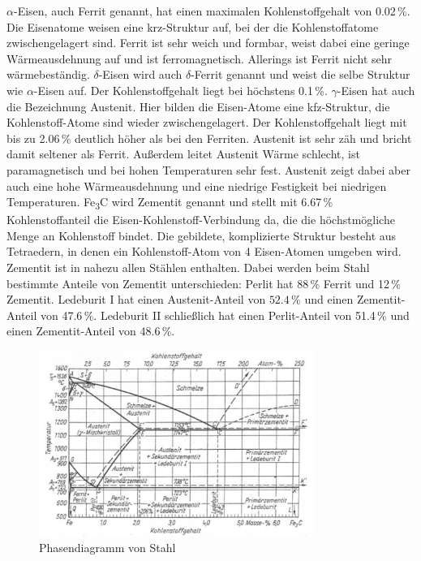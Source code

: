\documentclass[german, %
parskip=full, %
bibliography=totoc, %
]{scrartcl}
\begin{document}
$\alpha$-Eisen, auch Ferrit genannt, hat einen maximalen Kohlenstoffgehalt von 0.02\,\%. Die Eisenatome weisen eine krz-Struktur auf, bei der die Kohlenstoffatome zwischengelagert sind. Ferrit ist sehr weich und formbar, weist dabei eine geringe Wärmeausdehnung auf und ist ferromagnetisch. Allerings ist Ferrit nicht sehr wärmebeständig. \cite{ferrit}
$\delta$-Eisen wird auch $\delta$-Ferrit genannt und weist die selbe Struktur wie $\alpha$-Eisen auf. Der Kohlenstoffgehalt liegt bei höchstens 0.1\,\%. 
$\gamma$-Eisen hat auch die Bezeichnung Austenit. Hier bilden die Eisen-Atome eine kfz-Struktur, die Kohlenstoff-Atome sind wieder zwischengelagert. Der Kohlenstoffgehalt liegt mit bis zu 2.06\,\% deutlich höher als bei den Ferriten. Austenit ist sehr zäh und bricht damit seltener als Ferrit. Außerdem leitet Austenit Wärme schlecht, ist paramagnetisch und bei hohen Temperaturen sehr fest. Austenit zeigt dabei aber auch eine hohe Wärmeausdehnung und eine niedrige Festigkeit bei niedrigen Temperaturen. \cite{austenit}
Fe\textsubscript{3}C wird Zementit genannt und stellt mit 6.67\,\% Kohlenstoffanteil die Eisen-Kohlenstoff-Verbindung da, die die höchstmögliche Menge an Kohlenstoff bindet. Die gebildete, komplizierte Struktur besteht aus Tetraedern, in denen ein Kohlenstoff-Atom von 4 Eisen-Atomen umgeben wird. Zementit ist in nahezu allen Stählen enthalten. Dabei werden beim Stahl bestimmte Anteile von Zementit unterschieden: Perlit hat 88\,\% Ferrit und 12\,\% Zementit. Ledeburit I hat einen Austenit-Anteil von $52.4\,\%$ und einen Zementit-Anteil von 47.6\,\%. Ledeburit II schließlich hat einen Perlit-Anteil von 51.4\,\% und einen Zementit-Anteil von 48.6\,\%.

\begin{figure}[hb] 
  \centering
     \includegraphics[width=0.8\textwidth]{Stahl_Phase}
  \caption{Phasendiagramm von Stahl}
  \label{fig:phasestahl}
\end{figure}
\end{document}
